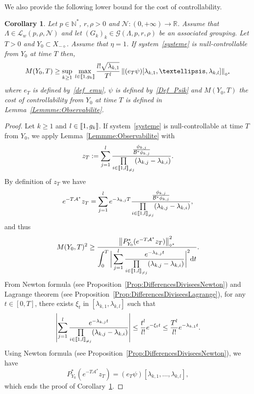 \documentclass[11pt]{article}
\newtheorem{coro}[theo]{Corollary}
\theoremstyle{definition}
\numberwithin{equation}{section}
\numberwithin{figure}{section}
\numberwithin{table}{section}
\newcommand{\llbracket}{\mathopen{[\mkern -2.7mu[}}
\newcommand{\rrbracket}{\mathclose{]\mkern -2.7mu]}}
\newcommand{\inter}[2]{\llbracket #1,#2 \rrbracket}
\newcommand{\interexclu}[3]{\llbracket #1,#2\rrbracket_{\neq #3}}
\newcommand\As{\mathcal{A}^*}
\newcommand\Bs{\mathcal{B}^*}
\newcommand{\Xmalpha}{X_{-\diamond}}
\newcommand{\Fzp}{Y_0}
\newcommand{\normeXalphas}[1]{\left\| #1 \right\|_{\diamond^*}}
\newcommand{\PFa}{P_{\Fzp}^*}
\newcommand{\n}{g}
\newcommand{\LL}{\mathcal{L}}
\newcommand{\NN}{\mathcal{N}}
\newcommand{\N}{\mathbb{N}}
\newcommand{\R}{\mathbb{R}}
\begin{document}
We also provide the following lower bound for the cost of controllability.
\begin{coro} \label{Coro:CoutControle_inferieur}
Let $p \in \N^*$, $r, \rho > 0$ and $\NN : (0,+\infty) \to \R$. Assume that $\Lambda \in \LL_w(p,\rho, \NN)$ and let $(G_k)_k\in \mathcal{G}(\Lambda,p,r,\rho)$ be an associated grouping. Let $T>0$ and $\Fzp \subset \Xmalpha$. Assume that $\eta=1$. If system~\eqref{systeme} is null-controllable from $\Fzp$ at time $T$ then,
\[
M(\Fzp,T) \geq \sup\limits_{k \geq 1} \: \max\limits_{l \in \inter{1}{\n_k}}
\frac{l! \sqrt{\lambda_{k,1}}}{T^l} \normeXalphas{ (e_T \psi) [\lambda_{k,1}, \dots, \lambda_{k,l}] }
\]
where $e_T$ is defined by~\eqref{def_emu}, $\psi$ is defined by~\eqref{Def_Psik} and $M(\Fzp,T)$ the cost of controllability from $\Fzp$ at time $T$ is defined in Lemma~\ref{Lemmme:Observabilite}.
\end{coro}


\begin{proof}
Let $k\geq1$ and $l \in \inter{1}{\n_k}$. If system~\eqref{systeme} is null-controllable at time $T$ from $\Fzp$, we apply Lemma~\ref{Lemmme:Observabilite} with
\[
z_T:=\sum_{j=1}^{l} \frac{ \frac{\phi_{k,j}}{\Bs \phi_{k,j}} }{\prod\limits_{i\in \interexclu{1}{l}{j}} (\lambda_{k,j}-\lambda_{k,i})}.
\]
By definition of $z_T$ we have
\[
e^{-T \As} z_T = \sum_{j=1}^{l} e^{-\lambda_{k,j} T} \frac{ \frac{\phi_{k,j}}{\Bs \phi_{k,j}} }{\prod\limits_{i\in \interexclu{1}{l}{j}} (\lambda_{k,j}-\lambda_{k,i})},
\]
and thus
\begin{equation*}
M(\Fzp, T)^2 \geq \dfrac{\normeXalphas{ \PFa (e^{-T\As} z_T) }^2}{\displaystyle\int_0^T \bigg| \sum_{j=1}^{l} \frac{e^{-\lambda_{k,j} t}}{\prod\limits_{i\in \interexclu{1}{l}{j}} (\lambda_{k,j}-\lambda_{k,i})} \bigg|^2 \mathrm{d}t}.
\end{equation*}
From Newton formula (see Proposition~\ref{Prop:DifferencesDiviseesNewton}) and Lagrange theorem (see Proposition~\ref{Prop:DifferencesDiviseesLagrange}), for any $t \in [0,T]$, there exists $\xi_{t}$ in $[\lambda_{k,1}, \lambda_{k,l}]$ such that
\[
\left| \sum_{j=1}^{l} \frac{e^{-\lambda_{k,j} t}}{\prod\limits_{i\in \interexclu{1}{l}{j}} (\lambda_{k,j}-\lambda_{k,i})} \right|
\leq \frac{t^{l}}{l!} e^{-\xi_{t} t} \leq \frac{T^{l}}{l!} e^{-\lambda_{k,1} t}.
\]
Using Newton formula (see Proposition~\ref{Prop:DifferencesDiviseesNewton}), we have
\[
\PFa (e^{-T\As} z_T) = (e_T \psi) [\lambda_{k,1}, \dots, \lambda_{k,l}],
\]
which ends the proof of Corollary~\ref{Coro:CoutControle_inferieur}.
\end{proof}
\end{document}
